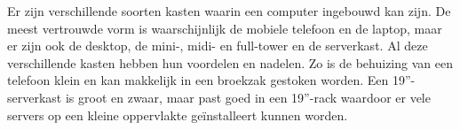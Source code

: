 Er zijn verschillende soorten kasten waarin een computer ingebouwd kan zijn. De meest vertrouwde vorm is waarschijnlijk de mobiele telefoon en de laptop, maar er zijn ook de desktop, de mini-, midi- en full-tower en de serverkast. Al deze verschillende kasten hebben hun voordelen en nadelen. Zo is de behuizing van een telefoon klein en kan makkelijk in een broekzak gestoken worden. Een 19''-serverkast is groot en zwaar, maar past goed in een 19''-rack waardoor er vele servers op een kleine oppervlakte ge\"installeert kunnen worden.
